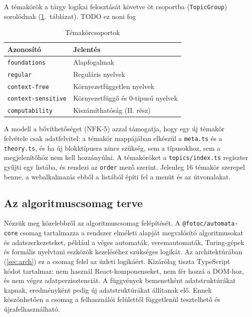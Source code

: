 A témakörök a tárgy logikai felosztását követve öt csoportba
(\texttt{TopicGroup}) sorolódnak (\ref{tab:groups}.~táblázat). TODO ez noni fog

\begin{table}[htbp]
    \centering
    \begin{tabular}{l l}
        \toprule
        \textbf{Azonosító} & \textbf{Jelentés} \\
        \midrule
        \texttt{foundations}       & Alapfogalmak \\
        \texttt{regular}           & Reguláris nyelvek \\
        \texttt{context-free}      & Környezetfüggetlen nyelvek \\
        \texttt{context-sensitive} & Környezetfüggő és 0-típusú nyelvek \\
        \texttt{computability}     & Kiszámíthatóság (II. rész) \\
        \bottomrule
    \end{tabular}
    \caption{Témakörcsoportok}
    \label{tab:groups}
\end{table}

A modell a bővíthetőséget (NFK-5) azzal támogatja, hogy egy új témakör
felvétele csak adatfelvitel: a témakör mappájában elkészül a
\texttt{meta.ts} és a \texttt{theory.ts}, és ha új blokktípusra nincs
szükség, sem a típusokhoz, sem a megjelenítőhöz nem kell hozzányúlni.
A témaköröket a \texttt{topics/index.ts} regiszter gyűjti egy listába,
és rendezi az \texttt{order} mező szerint. Jelenleg 16 témakör szerepel
benne, a webalkalmazás ebből a listából építi fel a menüt és az
útvonalakat.

\subsection{Az algoritmuscsomag terve}
\label{sec:core-design}

Nézzük meg közelebbről az algoritmuscsomag felépítését.
A \texttt{@fotoc/automata-core} csomag tartalmazza a rendszer elméleti alapját
megvalósító algoritmusokat és adatszerkezeteket, például a véges automaták,
veremautomaták, Turing-gépek és formális nyelvtani eszközök kezeléséhez szükséges logikát.
Az architektúrában (\ref{sec:arch}) ez a csomag felel az üzleti logikáért. 
Kizárólag tiszta TypeScript kódot tartalmaz: nem használ React-komponenseket,
nem fér hozzá a DOM-hoz, és nem végez adatperzisztenciát. 
A függvények bemenetként adatstruktúrákat kapnak, eredményként pedig
új adatstruktúrákat állítanak elő.
Ennek köszönhetően a csomag a felhasználói felülettől függetlenül tesztelhető
és újrafelhasználható.

